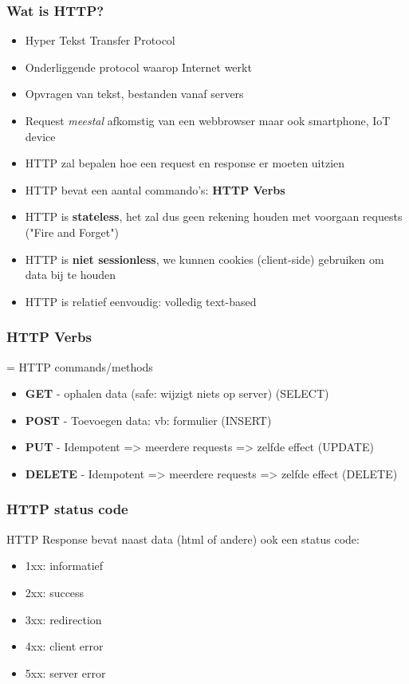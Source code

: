 \documentclass{article}
\newcommand{\bold}[1]{\textbf{#1}}
\begin{document}
\subsubsection{Wat is HTTP?}
\begin{itemize}
    \item Hyper Tekst Transfer Protocol
    \item Onderliggende protocol waarop Internet werkt
    \item Opvragen van tekst, bestanden vanaf servers
    \item Request \textit{meestal} afkomstig van een webbrowser maar ook smartphone, IoT device
    \item HTTP zal bepalen hoe een request en response er moeten uitzien
    \item HTTP bevat een aantal commando’s: \bold{HTTP Verbs}
    \item HTTP is \bold{stateless}, het zal dus geen rekening houden met voorgaan requests ("Fire and Forget")
    \item HTTP is \bold{niet sessionless}, we kunnen cookies (client-side) gebruiken om data bij te houden
    \item HTTP is relatief eenvoudig: volledig text-based
\end{itemize}

\subsubsection{HTTP Verbs}
= HTTP commands/methods

\begin{itemize}
    \item \bold{GET} - ophalen data (safe: wijzigt niets op server) (SELECT)
    \item \bold{POST} - Toevoegen data: vb: formulier (INSERT)
    \item \bold{PUT} - Idempotent => meerdere requests => zelfde effect (UPDATE)
    \item \bold{DELETE} - Idempotent => meerdere requests => zelfde effect (DELETE)
\end{itemize}

\subsubsection{HTTP status code}
HTTP Response bevat naast data (html of andere) ook een status code: 

\begin{itemize}
    \item 1xx: informatief
    \item 2xx: success
    \item 3xx: redirection
    \item 4xx: client error
    \item 5xx: server error
\end{itemize}
\end{document}

